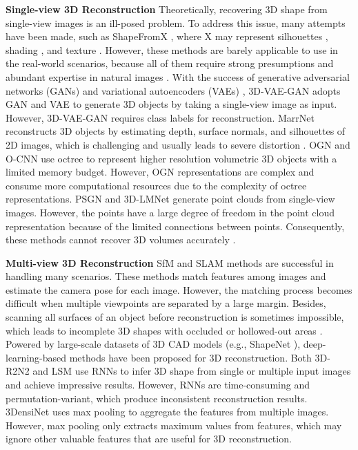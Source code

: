 \documentclass[10pt,twocolumn,letterpaper]{article}
\begin{document}
\noindent \textbf{Single-view 3D Reconstruction}
Theoretically, recovering 3D shape from single-view images is an ill-posed problem.
To address this issue, many attempts have been made, such as ShapeFromX \cite{DBLP:journals/pami/BarronM15, DBLP:journals/ijcv/SavareseARBP07}, where X may represent silhouettes \cite{DBLP:conf/cvpr/DibraJOZG17}, shading \cite{DBLP:conf/cvpr/RichterR15}, and texture \cite{DBLP:journals/ai/Witkin81}.
However, these methods are barely applicable to use in the real-world scenarios, because all of them require strong presumptions and abundant expertise in natural images \cite{DBLP:journals/access/ZhangLLPL19}. 
With the success of generative adversarial networks (GANs) \cite{DBLP:conf/nips/GoodfellowPMXWOCB14} and variational autoencoders (VAEs) \cite{DBLP:journals/corr/KingmaW13}, 3D-VAE-GAN \cite{DBLP:conf/nips/0001ZXFT16} adopts GAN and VAE to generate 3D objects by taking a single-view image as input.
However, 3D-VAE-GAN requires class labels for reconstruction.
MarrNet \cite{DBLP:conf/nips/0001WXSFT17} reconstructs 3D objects by estimating depth, surface normals, and silhouettes of 2D images, which is challenging and usually leads to severe distortion \cite{DBLP:phdthesis/ucb/Tulsiani18}.
OGN \cite{DBLP:conf/iccv/TatarchenkoDB17} and O-CNN \cite{DBLP:journals/tog/WangLGST17} use octree to represent higher resolution volumetric 3D objects with a limited memory budget.
However, OGN representations are complex and consume more computational resources due to the complexity of octree representations.
PSGN \cite{DBLP:conf/cvpr/FanSG17} and 3D-LMNet \cite{DBLP:conf/bmvc/MandikalLAR18} generate point clouds from single-view images.
However, the points have a large degree of freedom in the point cloud representation because of the limited connections between points.
Consequently, these methods cannot recover 3D volumes accurately \cite{DBLP:conf/eccv/WangZLF18}.

\noindent \textbf{Multi-view 3D Reconstruction}
SfM \cite{DBLP:journals/acta/OnurVRA17} and SLAM \cite{DBLP:journals/air/Fuentes-PachecoAR15} methods are successful in handling many scenarios.
These methods match features among images and estimate the camera pose for each image.
However, the matching process becomes difficult when multiple viewpoints are separated by a large margin.
Besides, scanning all surfaces of an object before reconstruction is sometimes impossible, which leads to incomplete 3D shapes with occluded or hollowed-out areas \cite{DBLP:journals/pami/YangRMTW18}.
Powered by large-scale datasets of 3D CAD models (e.g., ShapeNet \cite{DBLP:conf/cvpr/WuSKYZTX15}), deep-learning-based methods have been proposed for 3D reconstruction.
Both 3D-R2N2 \cite{DBLP:conf/eccv/ChoyXGCS16} and LSM \cite{DBLP:conf/nips/KarHM17} use RNNs to infer 3D shape from single or multiple input images and achieve impressive results.
However, RNNs are time-consuming and permutation-variant, which produce inconsistent reconstruction results.
3DensiNet \cite{DBLP:conf/mm/WangWF17} uses max pooling to aggregate the features from multiple images.
However, max pooling only extracts maximum values from features, which may ignore other valuable features that are useful for 3D reconstruction.
\end{document}
